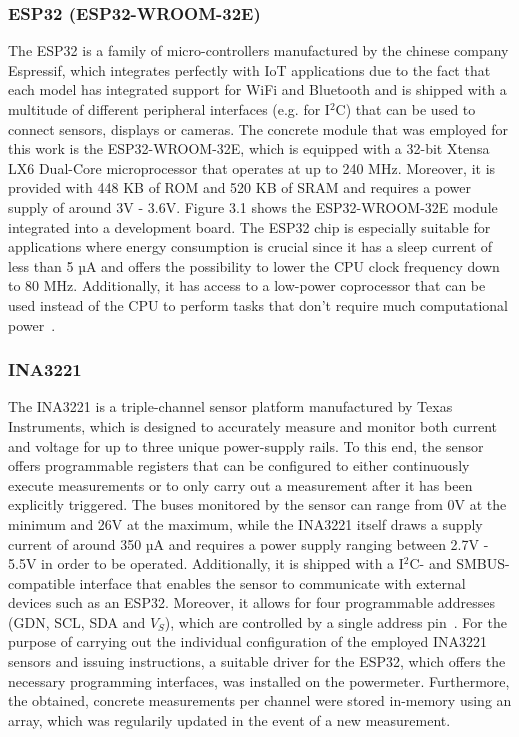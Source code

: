 \subsubsection{ESP32 (ESP32-WROOM-32E)}
The ESP32 is a family of micro-controllers manufactured by the chinese company Espressif, which integrates perfectly with IoT applications due to the fact that each model has integrated support for WiFi and Bluetooth and is shipped with a multitude of different peripheral interfaces (e.g. for I$^{2}$C) that can be used to connect sensors, displays or cameras. The concrete module that was employed for this work is the ESP32-WROOM-32E, which is equipped with a 32-bit Xtensa LX6 Dual-Core microprocessor that operates at up to 240 MHz. Moreover, it is provided with 448 KB of ROM and 520 KB of SRAM and requires a power supply of around 3V - 3.6V. Figure 3.1 shows the ESP32-WROOM-32E module integrated into a development board. The ESP32 chip is especially suitable for applications where energy consumption is crucial since it has a sleep current of less than 5 µA and offers the possibility to lower the CPU clock frequency down to 80 MHz. Additionally, it has access to a low-power coprocessor that can be used instead of the CPU to perform tasks that don't require much computational power~\parencite{esp32-manual}.

\subsubsection{INA3221}
The INA3221 is a triple-channel sensor platform manufactured by Texas Instruments, which is designed to accurately measure and monitor both current and voltage for up to three unique power-supply rails. To this end, the sensor offers programmable registers that can be configured to either continuously execute measurements or to only carry out a measurement after it has been explicitly triggered. The buses monitored by the sensor can range from 0V at the minimum and 26V at the maximum, while the INA3221 itself draws a supply current of around 350 µA and requires a power supply ranging between 2.7V - 5.5V in order to be operated. Additionally, it is shipped with a I$^{2}$C- and SMBUS-compatible interface that enables the sensor to communicate with external devices such as an ESP32. Moreover, it allows for four programmable addresses (GDN, SCL, SDA and $V_{S}$), which are controlled by a single address pin~\parencite{ina3221-manual}. For the purpose of carrying out the individual configuration of the employed INA3221 sensors and issuing instructions, a suitable driver for the ESP32, which offers the necessary programming interfaces, was installed on the powermeter. Furthermore, the obtained, concrete measurements per channel were stored in-memory using an array, which was regularily updated in the event of a new measurement.

